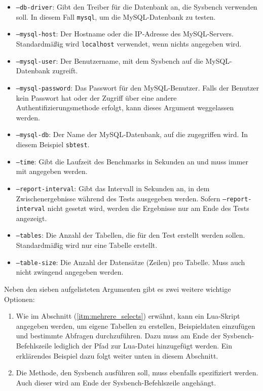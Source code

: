 \begin{itemize}
    \item \texttt{--db-driver}: Gibt den Treiber für die Datenbank an, die Sysbench verwenden soll.
          In diesem Fall \texttt{mysql}, um die MySQL-Datenbank zu testen.
    \item \texttt{--mysql-host}: Der Hostname oder die IP-Adresse des MySQL-Servers.
          Standardmäßig wird \texttt{localhost} verwendet, wenn nichts angegeben wird.
    \item \texttt{--mysql-user}: Der Benutzername, mit dem Sysbench auf die MySQL-Datenbank zugreift.
    \item \texttt{--mysql-password}: Das Passwort für den MySQL-Benutzer.
          Falls der Benutzer kein Passwort hat oder der Zugriff über eine andere Authentifizierungsmethode erfolgt, kann dieses Argument weggelassen werden.
    \item \texttt{--mysql-db}: Der Name der MySQL-Datenbank, auf die zugegriffen wird.
          In diesem Beispiel \texttt{sbtest}.
    \item \texttt{--time}: Gibt die Laufzeit des Benchmarks in Sekunden an und muss immer mit angegeben werden.
    \item \texttt{--report-interval}: Gibt das Intervall in Sekunden an, in dem Zwischenergebnisse während des Tests ausgegeben werden.
          Sofern \texttt{--report-interval} nicht gesetzt wird, werden die Ergebnisse nur am Ende des Tests angezeigt.
    \item \texttt{--tables}: Die Anzahl der Tabellen, die für den Test erstellt werden sollen.
          Standardmäßig wird nur eine Tabelle erstellt.
    \item \texttt{--table-size}: Die Anzahl der Datensätze (Zeilen) pro Tabelle.
          Muss auch nicht zwingend angegeben werden.
\end{itemize}

Neben den sieben aufgelisteten Argumenten gibt es zwei weitere wichtige Optionen:
\begin{enumerate}
    \item Wie im Abschnitt (\ref{itm:mehrere_selects}) erwähnt, kann ein Lua-Skript angegeben werden, um eigene
    Tabellen zu erstellen, Beispieldaten einzufügen und bestimmte Abfragen durchzuführen.
    Dazu muss am Ende der Sysbench-Befehlszeile lediglich der Pfad zur Lua-Datei hinzugefügt werden.
    Ein erklärendes Beispiel dazu folgt weiter unten in diesem Abschnitt.
    \item Die Methode, den Sysbench ausführen soll, muss ebenfalls spezifiziert werden.
    Auch dieser wird am Ende der Sysbench-Befehlszeile angehängt.
\end{enumerate}

